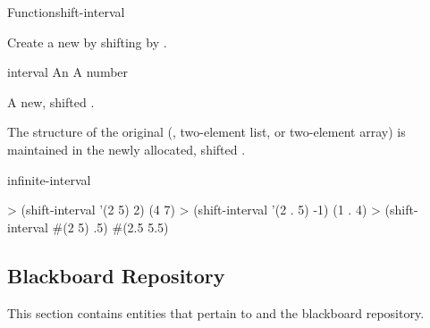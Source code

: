 \documentclass[10pt,twoside,english,pdftex]{article}
\begin{document}
\begin{functiondoc}{Function}{shift-interval}%
  {
    \returns{} }
%
%

\fnsyntax

\fnpurpose Create a new  by shifting  by
.

\fnpackage {}

\fnmodule {}

\fnargs
\begin{args}{interval}
\arg[interval] An 
\arg[amount] A number
\end{args}

\fnreturns A new, shifted .

\fndescription The structure of the original 
(, two-element list, or two-element array) is maintained in the
newly allocated, shifted .

\begin{alsos}{infinite-interval}
\end{alsos}

\fnexamples
%
\W\supp
\begin{example}
> (shift-interval '(2 5) 2)
(4 7)
> (shift-interval '(2 . 5) -1)
(1 . 4)
> (shift-interval #(2 5) .5)
#(2.5 5.5)
\end{example}

\end{functiondoc}


\T\markright{}%
\T\pagestyle{plain}
\T\clearpage
\W{}
\T\pagestyle{fancy}
\T\thispagestyle{fancybottom}
\T\global\def\fnlastname{ }%

\subsection{Blackboard Repository}
\label{sec:bb-repository}%

This section contains  entities that pertain to
 and the blackboard repository.

\W\entities
\T\clearpage
\end{document}
